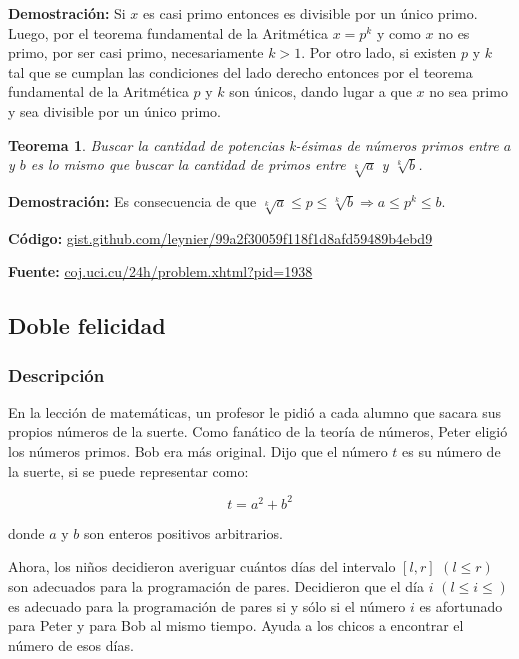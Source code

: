 \documentclass[12pt]{article}
\newcommand{\proof}{\textbf{Demostración:} }
\newcommand{\nl}{\vspace{0.3cm}}
\newtheorem{theorem}{Teorema}
\begin{document}
\newpage

\proof Si $x$ es casi primo entonces es divisible por un único primo. Luego, por el teorema fundamental de la Aritmética $x = p^k$ y como $x$ no es primo, por ser casi primo, necesariamente $k > 1$. Por otro lado, si existen $p$ y $k$ tal que se cumplan las condiciones del lado derecho entonces por el teorema fundamental de la Aritmética $p$ y $k$ son únicos, dando lugar a que $x$ no sea primo y sea divisible por un único primo.

\begin{theorem}
	Buscar la cantidad de potencias k-ésimas de números primos entre $a$ y $b$ es lo mismo que buscar la cantidad de primos entre $\sqrt[k]{a}$ y $\sqrt[k]{b}$.
\end{theorem}

\proof Es consecuencia de que $\sqrt[k]{a} \leqslant p \leqslant \sqrt[k]{b} \Rightarrow a \leqslant p^k \leqslant b$.

\nl

\textbf{Código:} \href{https://gist.github.com/leynier/99a2f30059f118f1d8afd59489b4ebd9}{gist.github.com/leynier/99a2f30059f118f1d8afd59489b4ebd9}

\nl

\textbf{Fuente:} \href{http://coj.uci.cu/24h/problem.xhtml?pid=1938}{coj.uci.cu/24h/problem.xhtml?pid=1938}

\subsection{Doble felicidad}

\subsubsection{Descripción}

En la lección de matemáticas, un profesor le pidió a cada alumno que sacara sus propios números de la suerte. Como fanático de la teoría de números, Peter eligió los números primos. Bob era más original. Dijo que el número $t$ es su número de la suerte, si se puede representar como:

$$ t = a^2 + b^2 $$

donde $a$ y $b$ son enteros positivos arbitrarios.

\nl

Ahora, los niños decidieron averiguar cuántos días del intervalo $[l, r]$ $(l \leqslant r)$ son adecuados para la programación de pares. Decidieron que el día $i$ $(l \leqslant i \leqslant)$ es adecuado para la programación de pares si y sólo si el número $i$ es afortunado para Peter y para Bob al mismo tiempo. Ayuda a los chicos a encontrar el número de esos días.
\end{document}
